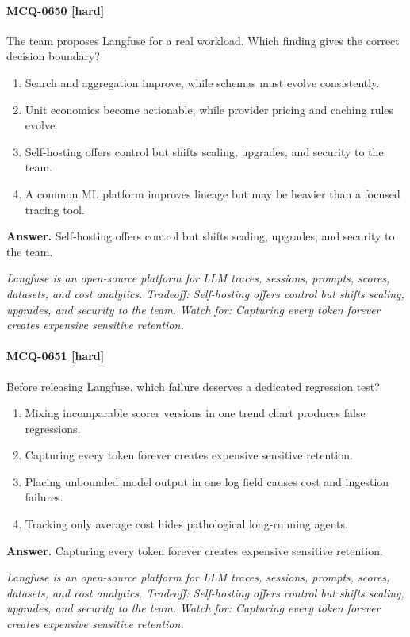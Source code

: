 \paragraph{MCQ-0650 [hard]} The team proposes Langfuse for a real workload. Which finding gives the correct decision boundary?
\begin{enumerate}[label=\Alph*.]
\item Search and aggregation improve, while schemas must evolve consistently.
\item Unit economics become actionable, while provider pricing and caching rules evolve.
\item Self-hosting offers control but shifts scaling, upgrades, and security to the team.
\item A common ML platform improves lineage but may be heavier than a focused tracing tool.
\end{enumerate}
\noindent\textbf{Answer.} Self-hosting offers control but shifts scaling, upgrades, and security to the team.
\par\textit{Langfuse is an open-source platform for LLM traces, sessions, prompts, scores, datasets, and cost analytics. Tradeoff: Self-hosting offers control but shifts scaling, upgrades, and security to the team. Watch for: Capturing every token forever creates expensive sensitive retention.}
\paragraph{MCQ-0651 [hard]} Before releasing Langfuse, which failure deserves a dedicated regression test?
\begin{enumerate}[label=\Alph*.]
\item Mixing incomparable scorer versions in one trend chart produces false regressions.
\item Capturing every token forever creates expensive sensitive retention.
\item Placing unbounded model output in one log field causes cost and ingestion failures.
\item Tracking only average cost hides pathological long-running agents.
\end{enumerate}
\noindent\textbf{Answer.} Capturing every token forever creates expensive sensitive retention.
\par\textit{Langfuse is an open-source platform for LLM traces, sessions, prompts, scores, datasets, and cost analytics. Tradeoff: Self-hosting offers control but shifts scaling, upgrades, and security to the team. Watch for: Capturing every token forever creates expensive sensitive retention.}
